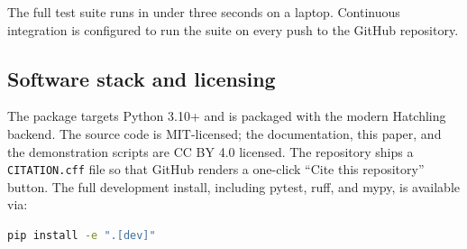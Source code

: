The full test suite runs in under three seconds on a laptop. Continuous integration is configured to run the suite on every push to the GitHub repository.

\subsection{Software stack and licensing}

The package targets Python 3.10+ and is packaged with the modern Hatchling backend. The source code is MIT-licensed; the documentation, this paper, and the demonstration scripts are CC BY 4.0 licensed. The repository ships a \texttt{CITATION.cff} file so that GitHub renders a one-click ``Cite this repository'' button. The full development install, including pytest, ruff, and mypy, is available via:

\begin{lstlisting}[language=bash]
pip install -e ".[dev]"
\end{lstlisting}
